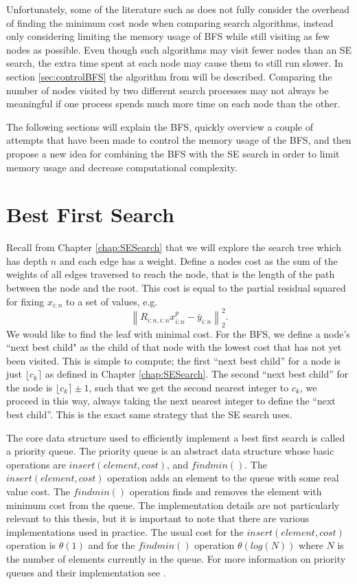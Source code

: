 \documentclass[12pt,Bold,letterpaper]{mcgilletdclass}
\newcommand{\vsp}{\vspace{\baselineskip}}
\begin{document}
Unfortunately, some of the literature such as \cite{StuBF07} does not fully consider the overhead of finding the minimum cost node when comparing search algorithms, instead only considering limiting the memory usage of BFS while still visiting as few nodes as possible. Even though such algorithms may visit fewer nodes than an SE search, the extra time spent at each node may cause them to still run slower. In section \ref{sec:controlBFS} the algorithm from \cite{StuBF07} will be described. Comparing the number of nodes visited by two different search processes may not always be meaningful if one process spends much more time on each node than the other.

The following sections will explain the BFS, quickly overview a couple of attempts that have been made to control the memory usage of the BFS, and then propose a new idea for combining the BFS with the SE search in order to limit memory usage and decrease computational complexity.

\vsp \section{Best First Search} \label{sec:BFS}

Recall from Chapter \ref{chap:SESearch} that we will explore the search tree which has depth $n$ and each edge has a weight. Define a  nodes cost as the sum of the  weights of all edges traversed to reach the node, that is the length of the path between the node and the root. This cost is equal to the partial residual squared for fixing $x_{i:n}$ to a set of values, e.g. $$\left \| R_{i:n,i:n}x_{i:n}^p - \bar{y}_{i:n}\right \|_2^2.$$ We would like to find the leaf with minimal cost. For the BFS, we define a node's ``next best child" as the child of that node with the lowest cost that has not yet been visited. This is simple to compute; the first ``next best child'' for a node is just $\lfloor c_k \rceil$ as defined in Chapter \ref{chap:SESearch}. The second ``next best child'' for the node is $\lfloor c_k \rceil \pm 1$, such that we get the second nearest integer to $c_k$, we proceed in this way, always taking the next nearest integer to define the ``next best child''. This is the exact same strategy that the SE search uses.

The core data structure used to efficiently implement a best first search is called a priority queue. The priority queue is an abstract data structure whose basic operations are $insert(element,cost)$, and $findmin()$. The $insert(element,cost)$ operation adds an element to the queue with some real value cost. The $findmin()$ operation finds and removes the element with minimum cost from the queue. The implementation details are not particularly relevant to this thesis, but it is important to note that there are various implementations used in practice. The usual cost for the $insert(element,cost)$ operation is $\theta(1)$ and for the $findmin()$ operation $\theta(log(N))$ where $N$ is the number of elements currently in the queue. For more information on priority queues and their implementation see \cite{AhoHU83}.
\end{document}
